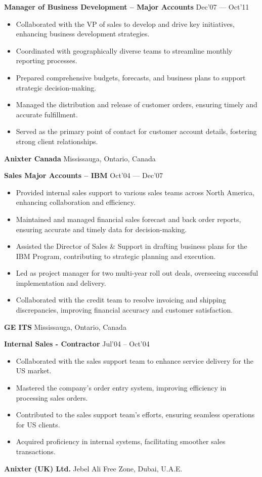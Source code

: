 \documentclass[11pt]{article}
\begin{document}
\textbf{Manager of Business Development – Major Accounts} \hfill Dec’07 — Oct’11
\begin{itemize}[noitemsep, topsep=0pt, partopsep=0pt, parsep=0pt]
    \item Collaborated with the VP of sales to develop and drive key initiatives, enhancing business development strategies.
    \item Coordinated with geographically diverse teams to streamline monthly reporting processes.
    \item Prepared comprehensive budgets, forecasts, and business plans to support strategic decision-making.
    \item Managed the distribution and release of customer orders, ensuring timely and accurate fulfillment.
    \item Served as the primary point of contact for customer account details, fostering strong client relationships.
\end{itemize}
\vspace{8pt}
\textbf{Anixter Canada} \hfill Mississauga, Ontario, Canada

\textbf{Sales Major Accounts – IBM} \hfill Oct’04 — Dec’07
\begin{itemize}[noitemsep, topsep=0pt, partopsep=0pt, parsep=0pt]
    \item Provided internal sales support to various sales teams across North America, enhancing collaboration and efficiency.
    \item Maintained and managed financial sales forecast and back order reports, ensuring accurate and timely data for decision-making.
    \item Assisted the Director of Sales \& Support in drafting business plans for the IBM Program, contributing to strategic planning and execution.
    \item Led as project manager for two multi-year roll out deals, overseeing successful implementation and delivery.
    \item Collaborated with the credit team to resolve invoicing and shipping discrepancies, improving financial accuracy and customer satisfaction.
\end{itemize}
\vspace{8pt}
\textbf{GE ITS} \hfill Mississauga, Ontario, Canada

\textbf{Internal Sales - Contractor} \hfill Jul’04 – Oct’04
\begin{itemize}[noitemsep, topsep=0pt, partopsep=0pt, parsep=0pt]
    \item Collaborated with the sales support team to enhance service delivery for the US market.
    \item Mastered the company's order entry system, improving efficiency in processing sales orders.
    \item Contributed to the sales support team's efforts, ensuring seamless operations for US clients.
    \item Acquired proficiency in internal systems, facilitating smoother sales transactions.
\end{itemize}
\vspace{8pt}
\textbf{Anixter (UK) Ltd.} \hfill Jebel Ali Free Zone, Dubai, U.A.E.
\end{document}
